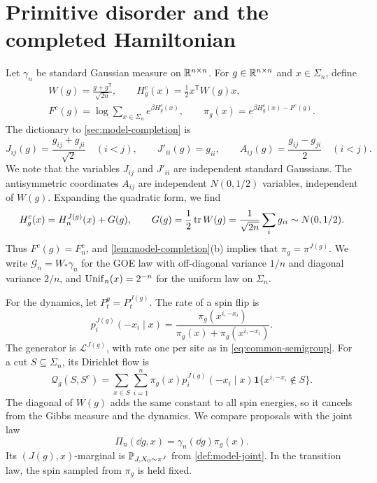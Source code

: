 \section{Primitive disorder and the completed Hamiltonian}\label{u:sec:primitive}

Let $\gamma_n$ be standard Gaussian measure on $\mathbb R^{n\times n}$.
For $g\in\mathbb R^{n\times n}$ and $x\in\Sigma_n$, define
\begin{equation}\label{u:eq:primitive}
\begin{gathered}
 W(g)=\frac{g+g^{\mathsf T}}{\sqrt{2n}},\qquad
 H_g^c(x)=\frac12x^{\mathsf T}W(g)x,\\
 F^c(g)=\log\sum_{x\in\Sigma_n}e^{\beta H_g^c(x)},\qquad
 \pi_g(x)=e^{\beta H_g^c(x)-F^c(g)}.
\end{gathered}
\end{equation}
The dictionary to \cref{sec:model-completion} is
\[
 J_{ij}(g)=\frac{g_{ij}+g_{ji}}{\sqrt2}\quad(i<j),\qquad
 J'_{ii}(g)=g_{ii},\qquad A_{ij}(g)=\frac{g_{ij}-g_{ji}}2\quad(i<j).
\]
We note that the variables $J_{ij}$ and $J'_{ii}$ are independent
standard Gaussians.
The antisymmetric coordinates $A_{ij}$ are independent $N(0,1/2)$
variables, independent of $W(g)$. Expanding the quadratic form, we find
\[
 H_g^c(x)=H_n^{J(g)}(x)+G(g),\qquad
 G(g)=\frac12\operatorname{tr} W(g)=\frac1{\sqrt{2n}}\sum_i g_{ii}\sim N(0,1/2).
\]
Thus $F^c(g)=F_n^c$, and \cref{lem:model-completion}(b) implies that
$\pi_g=\pi^{J(g)}$. We write $\mathcal G_n=W_*\gamma_n$ for the GOE
law with off-diagonal variance $1/n$ and diagonal variance $2/n$, and
$\operatorname{Unif}_n(x)=2^{-n}$ for the uniform law on $\Sigma_n$.

For the dynamics, let $P_t^g=P_t^{J(g)}$. The rate of a spin flip is
\begin{equation}\label{u:eq:flip-rate}
 p_i^{J(g)}(-x_i\mid x)
 =\frac{\pi_g(x^{i,-x_i})}{\pi_g(x)+\pi_g(x^{i,-x_i})}.
\end{equation}
The generator is $\mathcal L^{J(g)}$, with rate one per site as in
\eqref{eq:common-semigroup}. For a cut $S\subseteq\Sigma_n$, its
Dirichlet flow is
\begin{equation}\label{u:eq:cut-flow}
 \mathcal Q_g(S,S^c)=\sum_{x\in S}\sum_{i=1}^n
 \pi_g(x)p_i^{J(g)}(-x_i\mid x)
 \mathbf 1\{x^{i,-x_i}\notin S\}.
\end{equation}
The diagonal of $W(g)$ adds the same constant to all spin energies,
so it cancels from the Gibbs measure and the dynamics.
We compare proposals with the joint law
\begin{equation}\label{u:eq:target-law}
 \Pi_n(\dd g,x)=\gamma_n(\dd g)\pi_g(x).
\end{equation}
Its $(J(g),x)$-marginal is $\mathbb P_{J,X_0\sim\pi^J}$ from
\cref{def:model-joint}. In the transition law, the spin sampled from
$\pi_g$ is held fixed.


